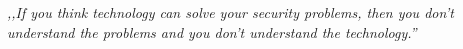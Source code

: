 
\chapter*{}

\mbox{}

\textit{,,If you think technology can solve your security problems, then you don't understand the problems and you don't understand the technology.''}


